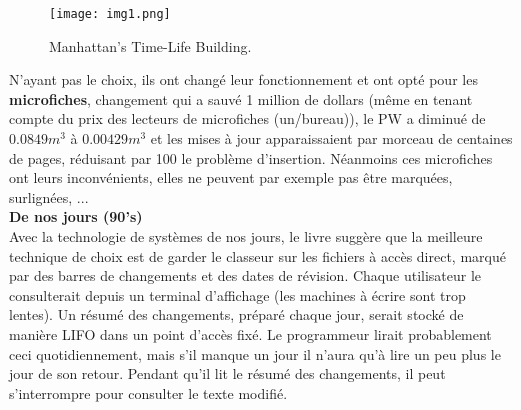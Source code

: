\documentclass[runningheads]{llncs}
\begin{document}
\begin{figure}
\begin{center}
  \texttt{[image: img1.png]}
  \caption{Manhattan's Time-Life Building.}
\end{center}
\end{figure}

N'ayant pas le choix, ils ont changé leur fonctionnement et ont opté pour les \textbf{microfiches}, changement qui a sauvé 1 
million de dollars (même en tenant compte du prix des lecteurs de microfiches (un/bureau)), le PW a diminué de $0.0849 m^3$ à 
$0.00429 m^3$ et les mises à jour apparaissaient par morceau de centaines de pages, réduisant par 100 le problème d'insertion.
Néanmoins ces microfiches ont leurs inconvénients, elles ne peuvent par exemple pas être marquées, surlignées, ... \\

\noindent\textbf{De nos jours (90's)}\\
Avec la technologie de systèmes de nos jours, le livre suggère que la meilleure technique de choix est de garder le classeur sur 
les fichiers à accès direct, marqué par des barres de changements et des dates de révision. Chaque utilisateur le consulterait 
depuis un terminal d'affichage (les machines à écrire sont trop lentes). Un résumé des changements, préparé chaque jour, serait 
stocké de manière LIFO dans un point d'accès fixé. Le programmeur lirait probablement ceci quotidiennement, mais s'il manque un 
jour il n'aura qu'à lire un peu plus le jour de son retour. Pendant qu'il lit le résumé des changements, il peut s'interrompre 
pour consulter le texte modifié.\\
\end{document}
